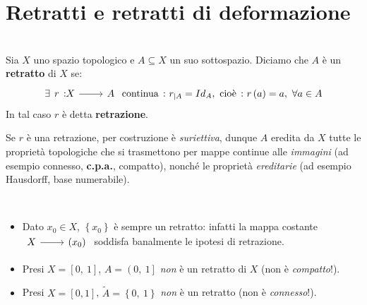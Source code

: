 \section{Retratti e retratti di deformazione}
\begin{define}[Retratto.]~{}\\
	Sia $X$ uno spazio topologico e $A\subseteq X$ un suo sottospazio. Diciamo che $A$ è un \textbf{retratto} di $X$ se:
	\begin{equation}
		\exists \funz{r}{X}{A}\text{ continua}\ \colon r_{\mid A}=Id_A,\ \text{cioè}\ \colon r\left(a\right)=a,\ \forall a\in A
	\end{equation}
In tal caso $r$ è detta \textbf{retrazione}.
\end{define}
\begin{observe}
Se $r$ è una retrazione, per costruzione è \textit{suriettiva}, dunque $A$ eredita da $X$ tutte le proprietà topologiche che si trasmettono per mappe continue alle \textit{immagini} (ad esempio connesso, \textbf{c.p.a.}, compatto), nonché le proprietà \textit{ereditarie} (ad esempio Hausdorff, base numerabile).
\end{observe}
\begin{examples}~{}
	\begin{itemize}
		\item Dato $x_0\in X$, $\left\{x_0\right\}$ è sempre un retratto: infatti la mappa costante $\funz{\ }{X}{\left(x_0\right)}$ soddisfa banalmente le ipotesi di retrazione.
		\item Presi $X=\left[0,\ 1\right]$, $A=\left(0,\ 1\right]$ \textit{non} è un retratto di $X$ (non è \textit{compatto}!).
		\item Presi $X=\left[0, 1\right]$, $\widetilde{A}=\left\{0,\ 1\right\}$ \textit{non} è un retratto (non è \textit{connesso}!).
	\end{itemize}
\vspace{-3mm}
\end{examples}
